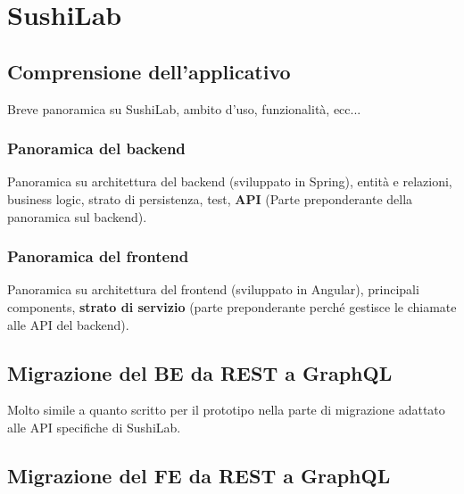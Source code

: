 \section{SushiLab}
\label{sushi-lab}
\subsection{Comprensione dell'applicativo}
Breve panoramica su SushiLab, ambito d'uso, funzionalità, ecc...
\subsubsection{Panoramica del backend}
Panoramica su architettura del backend (sviluppato in Spring), entità e relazioni, business logic, strato di persistenza, test, \textbf{API} (Parte preponderante della panoramica sul backend).
\subsubsection{Panoramica del frontend}
Panoramica su architettura del frontend (sviluppato in Angular), principali components, \textbf{strato di servizio} (parte preponderante perché gestisce le chiamate alle API del backend).
\subsection{Migrazione del BE da REST a GraphQL}
Molto simile a quanto scritto per il prototipo nella parte di migrazione adattato alle API specifiche di SushiLab.
\subsection{Migrazione del FE da REST a GraphQL}




